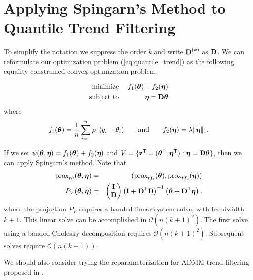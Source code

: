 \documentclass{article}
\newcommand{\Eqn}[1]{\hyperref[eq:#1]{{\rm (\ref*{eq:#1})}}} %
\newcommand{\Eqn}[1]{{(\ref{eq:#1})}} %
\newcommand{\Tra}{^{\sf T}} %
\newcommand{\Inv}{^{-1}} %
\newcommand{\V}[1]{{\bm{\mathbf{\MakeLowercase{#1}}}}} %
\newcommand{\VE}[2]{\MakeLowercase{#1}_{#2}} %
\newcommand{\M}[1]{{\bm{\mathbf{\MakeUppercase{#1}}}}} %
\newcommand{\Mn}[2]{\M{#1}^{(#2)}} %
\newcommand{\prox}[2]{\operatorname{prox}_{#1}({#2})}
\begin{document}
\section{Applying Spingarn's Method to Quantile Trend Filtering}

To simplify the notation we suppress the order $k$ and write $\Mn{D}{k}$ as $\M{D}$.
We can reformulate our optimization problem \Eqn{quantile_trend} as the following equality constrained convex optimization problem.

\begin{eqnarray*}
\text{minimize}\; && f_1(\V{\theta}) + f_2(\V{\eta}) \\
\text{subject to}\; && \V{\eta} = \M{D}\V{\theta}
\end{eqnarray*}
where
\begin{eqnarray*}
f_1(\V{\theta}) = \frac{1}{n}\sum_{i=1}^n \rho_\tau(\VE{y}{i} - \VE{\theta}{i}) \quad\quad \text{and} \quad\quad
f_2(\V{\eta}) = \lambda\lVert \V{\eta} \rVert_1.
\end{eqnarray*}

If we set $\psi(\V{\theta}, \V{\eta}) = f_1(\V{\theta}) + f_2(\V{\eta})$ and $V = \{ \V{z}\Tra = (\V{\theta}\Tra, \V{\eta}\Tra) : \V{\eta} = \M{D}\V{\theta} \}$, then we can apply Spingarn's method. Note that
\begin{eqnarray*}
\prox{th}{\V{\theta}, \V{\eta}} & = & (\prox{tf_1}{\V{\theta}}, \prox{tf_2}{\V{\eta}}) \\
P_V(\V{\theta}, \V{\eta}) & = & \begin{pmatrix}
\M{I} \\ \M{D}
\end{pmatrix}
\begin{pmatrix}
\M{I} + \M{D}\Tra\M{D}
\end{pmatrix}\Inv
\begin{pmatrix}
\V{\theta} + \M{D}\Tra\V{\eta}
\end{pmatrix},
\end{eqnarray*}
where the projection $P_V$ requires a banded linear system solve, with bandwidth $k + 1$.
This linear solve can be accomplished in $\mathcal{O}(n(k + 1)^2)$. The first solve using a banded Cholesky decomposition requires $\mathcal{O}(n(k + 1)^2)$. Subsequent solves require
$\mathcal{O}(n(k+1))$.

We should also consider trying the reparameterization for ADMM trend filtering proposed in \cite{Ramdas2016}.
\end{document}
